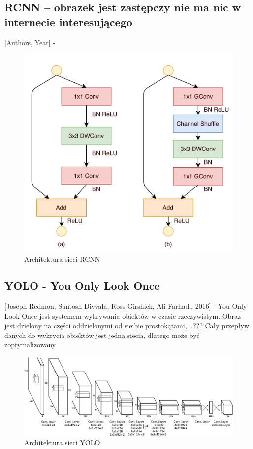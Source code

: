 \documentclass[12pt,a4paper,twoside,titlepage,openright]{book}
\begin{document}
{\subsection{RCNN -- obrazek jest zastępczy nie ma nic w internecie interesującego}
[Authors, Year] - \cite{DBLP:journals/corr/RenHG015}
\begin{figure}[h]
	\centering
			\includegraphics[resolution=120]{ResNeXt.png}
		\caption{Architektura sieci RCNN}
\end{figure}

\subsection{YOLO - You Only Look Once }
[Joseph Redmon, Santosh Divvala, Ross Girshick, Ali Farhadi, 2016] - You Only Look Once jest systemem wykrywania obiektów w czasie rzeczywistym. Obraz jest dzielony na części oddzielonymi od sieibie prostokątami, ..???
Cały przepływ danych do wykrycia obiektów jest jedną siecią, dlatego może być zoptymalizowany \cite{DBLP:journals/corr/RedmonDGF15}
\begin{figure}[h]
	\centering
			\includegraphics[resolution=120]{YOLO.png}
		\caption{Architektura sieci YOLO}
\end{figure}

}
\end{document}
